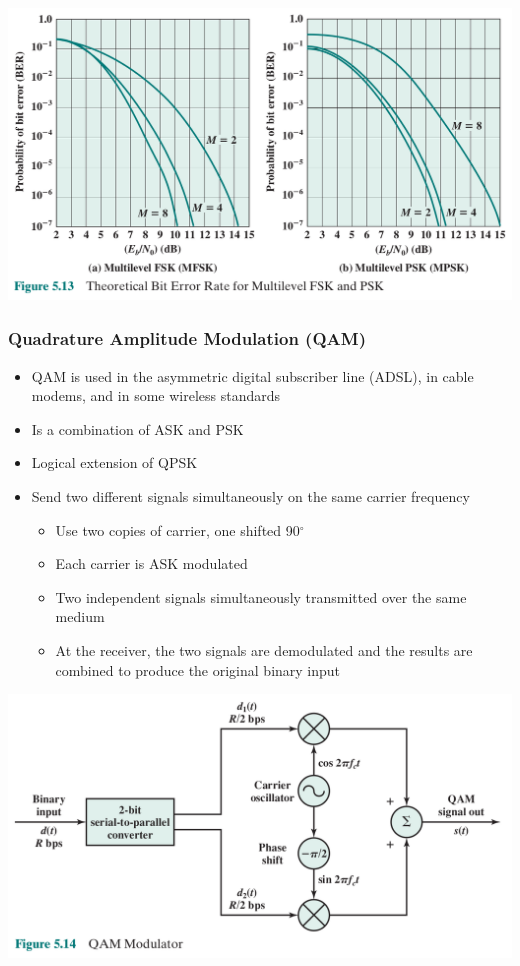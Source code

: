 \documentclass[pdflatex,compress]{beamer}
\begin{document}
\begin{frame}
	\begin{center}
		\includegraphics[width=\linewidth]{img/img19}
	\end{center}
\end{frame}

\begin{frame}
	\frametitle{Quadrature Amplitude Modulation (QAM)}
	\begin{itemize}
		\item QAM is used in the asymmetric digital subscriber line (ADSL), in cable modems, and in some wireless standards
		\item Is a combination of ASK and PSK
		\item Logical extension of QPSK
		\item Send two different signals simultaneously on the same carrier frequency
		\begin{itemize}
			\item Use two copies of carrier, one shifted 90$^{\circ}$
			\item Each carrier is ASK modulated
			\item Two independent signals simultaneously transmitted over the same medium
			\item At the receiver, the two signals are demodulated and the results are combined to produce the original binary input
		\end{itemize}
	\end{itemize}
\end{frame}

\begin{frame}
	\begin{center}
		\includegraphics[width=\linewidth]{img/img20}
	\end{center}
\end{frame}
\end{document}
